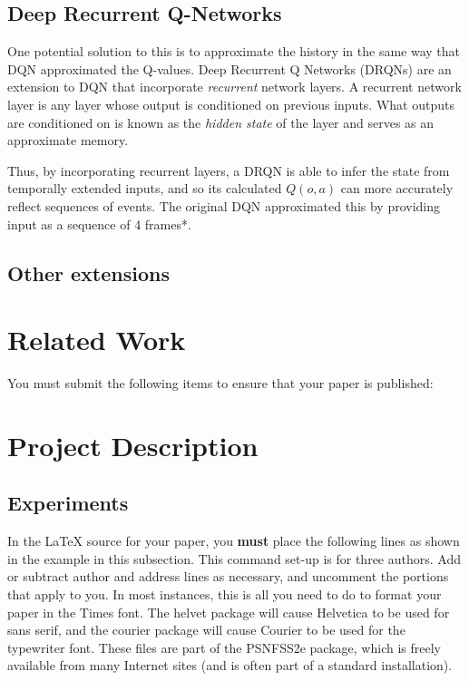 \documentclass[letterpaper]{article}
\begin{document}
 	\subsection{Deep Recurrent Q-Networks}
 	
 	One potential solution to this is to approximate the history in the same way that DQN approximated the Q-values. Deep Recurrent Q Networks (DRQNs) are an extension to DQN that incorporate \textit{recurrent} network layers. A recurrent network layer is any layer whose output is conditioned on previous inputs. What outputs are conditioned on is known as the \textit{hidden state} of the layer and serves as an approximate memory.
 	
 	Thus, by incorporating recurrent layers, a DRQN is able to infer the state from temporally extended inputs, and so its calculated $Q(o,a)$ can more accurately reflect sequences of events. The original DQN approximated this by providing input as a sequence of 4 frames*.
 	
 	\subsection{Other extensions}
 	
 	 
 	
	 
	
	\section{Related Work}
	You must submit the following items to ensure that your paper is published:
	
	\section{Project Description}
	
	\subsection{Experiments}
	
	In the \LaTeX{} source for your paper, you \textbf{must} place the following lines as shown in the example in this subsection. This command set-up is for three authors. Add or subtract author and address lines as necessary, and uncomment the portions that apply to you. In most instances, this is all you need to do to format your paper in the Times font. The helvet package will cause Helvetica to be used for sans serif, and the courier package will cause Courier to be used for the typewriter font. These files are part of the PSNFSS2e package, which is freely available from many Internet sites (and is often part of a standard installation).
	
\end{document}
